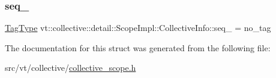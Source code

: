 \subsubsection{\texorpdfstring{seq\+\_\+}{seq\_}}
{\footnotesize\ttfamily \hyperlink{namespacevt_a84ab281dae04a52a4b243d6bf62d0e52}{Tag\+Type} vt\+::collective\+::detail\+::\+Scope\+Impl\+::\+Collective\+Info\+::seq\+\_\+ = no\+\_\+tag}



The documentation for this struct was generated from the following file\+:\begin{DoxyCompactItemize}
\item 
src/vt/collective/\hyperlink{collective__scope_8h}{collective\+\_\+scope.\+h}\end{DoxyCompactItemize}
